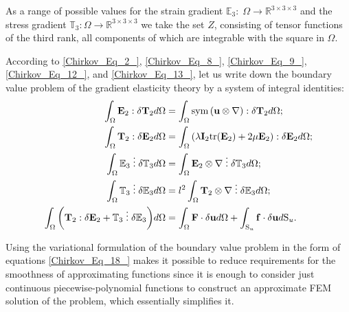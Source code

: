 As a range of possible values for the strain gradient ${{\mathbb E}}_3:\;\Omega \to{{\mathbb R}}^{3\times 3\times 3}$ and the stress gradient ${{\mathbb T}}_3:\Omega\to{\mathbb R}^{3\times 3\times 3}$ we take the set $Z$, consisting of tensor functions of the third rank, all components of which are integrable with the square in $\Omega $.

According to \eqref{Chirkov_Eq_2_}, \eqref{Chirkov_Eq_8_}, \eqref{Chirkov_Eq_9_}, \eqref{Chirkov_Eq_12_}, and \eqref{Chirkov_Eq_13_}, let us write down the boundary value problem of the gradient elasticity theory by a system of integral identities:
\begin{equation} \label{Chirkov_Eq_18_} 
	\begin{aligned}
		\displaystyle\int_{\Omega }{{{\mathbf E}}_2:\delta {{\mathbf T}}_2d\Omega }&=\displaystyle\int_{\Omega }{{\rm sym}\left({\mathbf u}\otimes \nabla \right):\delta {{\mathbf T}}_2d\Omega };
		\\
		\displaystyle\int_{\Omega }{{{\mathbf T}}_2:\delta {{\mathbf E}}_2d\Omega }&=\displaystyle\int_{\Omega }{\left(\lambda{{\mathbf I}}_2{\rm tr}({{\mathbf E}}_2)+2\mu{{\mathbf E}}_2\right):\delta {{\mathbf E}}_2d\Omega ;}
		\\
		\displaystyle\int_{\Omega }{{{\mathbb E}}_3\;\vdots\; \delta {{\mathbb T}}_3d\Omega }&=\displaystyle\int_{\Omega }{{{\mathbf E}}_2\otimes \nabla \;\vdots\; \delta {{\mathbb T}}_3d\Omega};
		\\
		\displaystyle\int_{\Omega }{{{\mathbb T}}_3\;\vdots\; \delta {{\mathbb E}}_3d\Omega }&=l^2\displaystyle\int_{\Omega }{{{\mathbf T}}_2\otimes \nabla \;\vdots\; \delta {{\mathbb E}}_3d\Omega ;}
		\\
		\displaystyle\int_{\Omega }{\left({{\mathbf T}}_2:\delta {{\mathbf E}}_2+{{\mathbb T}}_3\;\vdots\; \delta {{\mathbb E}}_3\right)}d\Omega &=\displaystyle\int_{\Omega }{{\mathbf F}\cdot \delta {\mathbf u}d\Omega }+\int_{{{\rm S}}_u}{{\mathbf f}\cdot \delta {\mathbf u}d{{\rm S}}_u}.   
	\end{aligned}                  
\end{equation} 

Using the variational formulation of the boundary value problem in the form of equations \eqref{Chirkov_Eq_18_} makes it possible to reduce requirements for the smoothness of approximating functions since it is enough to consider just continuous piecewise-polynomial functions to construct an approximate FEM solution of the problem, which essentially simplifies it.

